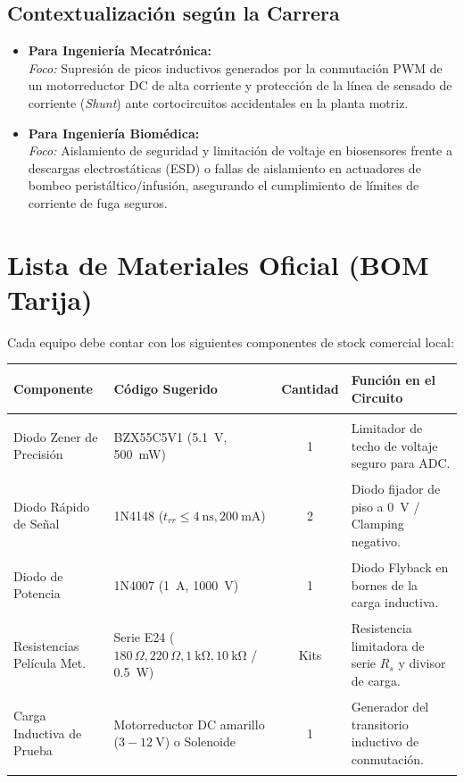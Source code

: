 \documentclass[11pt, a4paper]{article}
\begin{document}
\subsection*{Contextualización según la Carrera}
\begin{itemize}
    \item \faCogs \quad \textbf{Para Ingeniería Mecatrónica:} \\
    \textit{Foco:} Supresión de picos inductivos generados por la conmutación PWM de un motorreductor DC de alta corriente y protección de la línea de sensado de corriente (\textit{Shunt}) ante cortocircuitos accidentales en la planta motriz.
    \item \faHeartbeat \quad \textbf{Para Ingeniería Biomédica:} \\
    \textit{Foco:} Aislamiento de seguridad y limitación de voltaje en biosensores frente a descargas electrostáticas (ESD) o fallas de aislamiento en actuadores de bombeo peristáltico/infusión, asegurando el cumplimiento de límites de corriente de fuga seguros.
\end{itemize}

\section{Lista de Materiales Oficial (BOM Tarija)}
Cada equipo debe contar con los siguientes componentes de stock comercial local:

\begin{table}[h!]
\centering
\renewcommand{\arraystretch}{1.4}
\begin{tabularx}{\textwidth}{@{} >{\bfseries\raggedright\arraybackslash}p{3.8cm} >{\raggedright\arraybackslash}p{4cm} c X @{}}
\toprule
Componente & Código Sugerido & Cantidad & Función en el Circuito \\
\midrule
Diodo Zener de Precisión & BZX55C5V1 (\qty{5.1}{\volt}, \qty{500}{\milli\watt}) & 1 & Limitador de techo de voltaje seguro para ADC. \\
Diodo Rápido de Señal & 1N4148 ($t_{rr} \le \qty{4}{\nano\second}, \qty{200}{\milli\ampere}$) & 2 & Diodo fijador de piso a \qty{0}{\volt} / Clamping negativo. \\
Diodo de Potencia & 1N4007 (\qty{1}{\ampere}, \qty{1000}{\volt}) & 1 & Diodo Flyback en bornes de la carga inductiva. \\
Resistencias Película Met. & Serie E24 ($180\,\Omega, 220\,\Omega, \qty{1}{\kilo\ohm}, \qty{10}{\kilo\ohm}$ / \qty{0.5}{\watt}) & Kits & Resistencia limitadora de serie $R_s$ y divisor de carga. \\
Carga Inductiva de Prueba & Motorreductor DC amarillo ($3-\qty{12}{\volt}$) o Solenoide & 1 & Generador del transitorio inductivo de conmutación. \\
\bottomrule
\end{tabularx}
\end{table}
\end{document}

